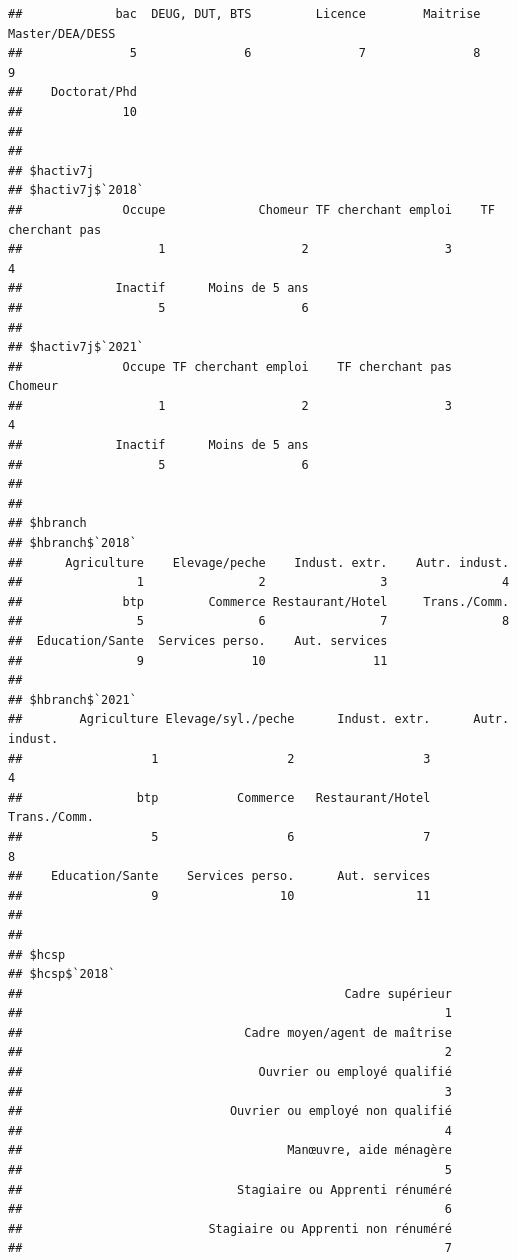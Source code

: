 \documentclass[
]{article}
\begin{document}
\begin{verbatim}
##             bac  DEUG, DUT, BTS         Licence        Maitrise Master/DEA/DESS 
##               5               6               7               8               9 
##    Doctorat/Phd 
##              10 
## 
## 
## $hactiv7j
## $hactiv7j$`2018`
##              Occupe             Chomeur TF cherchant emploi    TF cherchant pas 
##                   1                   2                   3                   4 
##             Inactif      Moins de 5 ans 
##                   5                   6 
## 
## $hactiv7j$`2021`
##              Occupe TF cherchant emploi    TF cherchant pas             Chomeur 
##                   1                   2                   3                   4 
##             Inactif      Moins de 5 ans 
##                   5                   6 
## 
## 
## $hbranch
## $hbranch$`2018`
##      Agriculture    Elevage/peche    Indust. extr.    Autr. indust. 
##                1                2                3                4 
##              btp         Commerce Restaurant/Hotel     Trans./Comm. 
##                5                6                7                8 
##  Education/Sante  Services perso.    Aut. services 
##                9               10               11 
## 
## $hbranch$`2021`
##        Agriculture Elevage/syl./peche      Indust. extr.      Autr. indust. 
##                  1                  2                  3                  4 
##                btp           Commerce   Restaurant/Hotel       Trans./Comm. 
##                  5                  6                  7                  8 
##    Education/Sante    Services perso.      Aut. services 
##                  9                 10                 11 
## 
## 
## $hcsp
## $hcsp$`2018`
##                                             Cadre supérieur 
##                                                           1 
##                               Cadre moyen/agent de maîtrise 
##                                                           2 
##                                 Ouvrier ou employé qualifié 
##                                                           3 
##                             Ouvrier ou employé non qualifié 
##                                                           4 
##                                     Manœuvre, aide ménagère 
##                                                           5 
##                              Stagiaire ou Apprenti rénuméré 
##                                                           6 
##                          Stagiaire ou Apprenti non rénuméré 
##                                                           7 

\end{verbatim}
\end{document}
